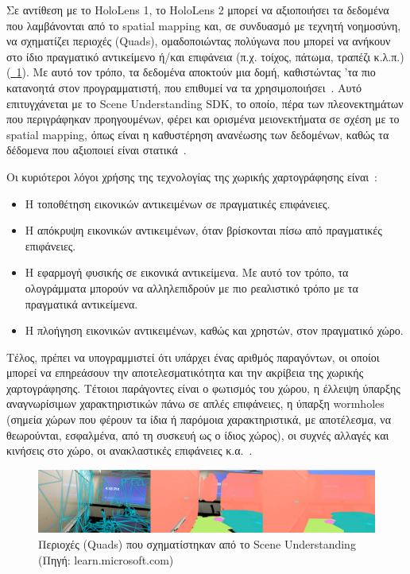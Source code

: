 Σε αντίθεση με το HoloLens 1, το HoloLens 2 μπορεί να αξιοποιήσει τα δεδομένα που λαμβάνονται από το spatial mapping και, σε συνδυασμό με τεχνητή νοημοσύνη, να σχηματίζει περιοχές (Quads), ομαδοποιώντας πολύγωνα που μπορεί να ανήκουν στο ίδιο πραγματικό αντικείμενο ή/και επιφάνεια (π.χ. τοίχος, πάτωμα, τραπέζι κ.λ.π.) (\hyperref[fig:sceneUnderstandingExample]{\schema~\ref*{fig:sceneUnderstandingExample}}). Με αυτό τον τρόπο, τα δεδομένα αποκτούν μια δομή, καθιστώντας 'τα πιο κατανοητά στον προγραμματιστή, που επιθυμεί να τα χρησιμοποιήσει~\cite{szymons_2022_scene}. Αυτό επιτυγχάνεται με το Scene Understanding SDK, το οποίο, πέρα των πλεονεκτημάτων που περιγράφηκαν προηγουμένων, φέρει και ορισμένα μειονεκτήματα σε σχέση με το spatial mapping, όπως είναι η καθυστέρηση ανανέωσης των δεδομένων, καθώς τα δέδομενα που αξιοποιεί είναι στατικά~\cite{mattzmsft_2023_spatial}.

Οι κυριότεροι λόγοι χρήσης της τεχνολογίας της χωρικής χαρτογράφησης είναι~\cite{mattzmsft_2023_spatial}:
\begin{itemize}
    \item Η τοποθέτηση εικονικών αντικειμένων σε πραγματικές επιφάνειες.
    \item Η απόκρυψη εικονικών αντικειμένων, όταν βρίσκονται πίσω από πραγματικές επιφάνειες.
    \item Η εφαρμογή φυσικής σε εικονικά αντικείμενα. Με αυτό τον τρόπο, τα ολογράμματα μπορούν να αλληλεπιδρούν με πιο ρεαλιστικό τρόπο με τα πραγματικά αντικείμενα.
    \item Η πλοήγηση εικονικών αντικειμένων, καθώς και χρηστών, στον πραγματικό χώρο.
\end{itemize}

Τέλος, πρέπει να υπογραμμιστεί ότι υπάρχει ένας αριθμός παραγόντων, οι οποίοι μπορεί να επηρεάσουν την αποτελεσματικότητα και την ακρίβεια της χωρικής χαρτογράφησης. Τέτοιοι παράγοντες είναι ο φωτισμός του χώρου, η έλλειψη ύπαρξης αναγνωρίσιμων χαρακτηριστικών πάνω σε απλές επιφάνειες, η ύπαρξη wormholes (σημεία χώρων που φέρουν τα ίδια ή παρόμοια χαρακτηριστικά, με αποτέλεσμα, να θεωρούνται, εσφαλμένα, από τη συσκευή ως ο ίδιος χώρος), οι συχνές αλλαγές και κινήσεις στο χώρο, οι ανακλαστικές επιφάνειες κ.α.~\cite{dorreneb_2022_hololens}.

\begin{figure}[!hb]
    \centering
    \includegraphics[width=1\textwidth]{images/sm_and_su_comparisson.png}
    \caption[Περιοχές (Quads) που σχηματίστηκαν από το Scene Understanding]{Περιοχές (Quads) που σχηματίστηκαν από το Scene Understanding {\footnotesize (Πηγή: learn.microsoft.com)}}\label{fig:sceneUnderstandingExample}
\end{figure}

